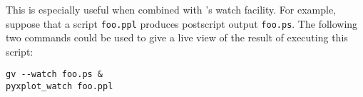 This is especially useful when combined with \ghostview's
watch facility. For example, suppose that a script {\tt foo.ppl} produces
postscript output {\tt foo.ps}. The following two commands could be used to
give a live view of the result of executing this script:

\begin{verbatim}
gv --watch foo.ps &
pyxplot_watch foo.ppl
\end{verbatim}

